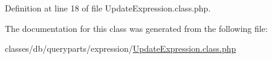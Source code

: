 Definition at line 18 of file Update\+Expression.\+class.\+php.



The documentation for this class was generated from the following file\+:\begin{DoxyCompactItemize}
\item 
classes/db/queryparts/expression/\hyperlink{UpdateExpression_8class_8php}{Update\+Expression.\+class.\+php}\end{DoxyCompactItemize}
